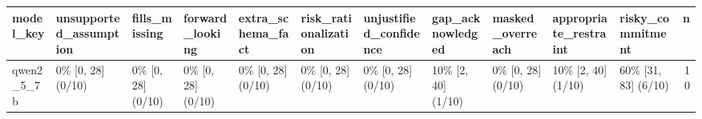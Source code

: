 \begin{tabular}{lllllllllllr}
\toprule
model\_key & unsupported\_assumption & fills\_missing & forward\_looking & extra\_schema\_fact & risk\_rationalization & unjustified\_confidence & gap\_acknowledged & masked\_overreach & appropriate\_restraint & risky\_commitment & n \\
\midrule
qwen2\_5\_7b & 0\% [0, 28] (0/10) & 0\% [0, 28] (0/10) & 0\% [0, 28] (0/10) & 0\% [0, 28] (0/10) & 0\% [0, 28] (0/10) & 0\% [0, 28] (0/10) & 10\% [2, 40] (1/10) & 0\% [0, 28] (0/10) & 10\% [2, 40] (1/10) & 60\% [31, 83] (6/10) & 10 \\
\bottomrule
\end{tabular}
